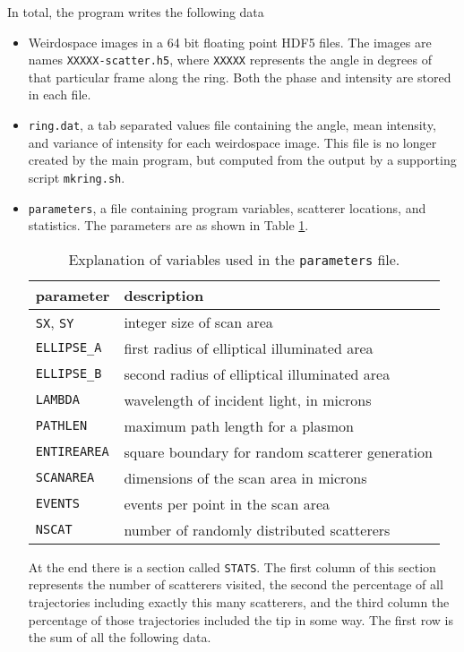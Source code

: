 In total, the program writes the following data
\begin{itemize}
  \item Weirdospace images in a 64 bit floating point HDF5 files.  The images
        are names {\tt XXXXX-scatter.h5}, where {\tt XXXXX} represents the angle
        in degrees of that particular frame along the ring.  Both the phase and
        intensity are stored in each file.
  \item {\tt ring.dat}, a tab separated values file containing the angle,
        mean intensity, and variance of intensity for each weirdospace image.  This
        file is no longer created by the main program, but computed from the output
        by a supporting script {\tt mkring.sh}.
  \item {\tt parameters}, a file containing program variables, scatterer
        locations, and statistics.  The parameters are as shown in Table
        \ref{tbl:parameters}.
        \begin{table}
          \label{tbl:parameters}
          \begin{center}
            \begin{tabular}{ll}
              \toprule
              parameter          & description                                     \\
              \midrule
              {\tt SX}, {\tt SY} & integer size of scan area                       \\
              {\tt ELLIPSE\_A}   & first radius of elliptical illuminated area     \\
              {\tt ELLIPSE\_B}   & second radius of elliptical illuminated area    \\
              {\tt LAMBDA}       & wavelength of incident light, in microns        \\
              {\tt PATHLEN}      & maximum path length for a plasmon               \\
              {\tt ENTIREAREA}   & square boundary for random scatterer generation \\
              {\tt SCANAREA}     & dimensions of the scan area in microns          \\
              {\tt EVENTS}       & events per point in the scan area               \\
              {\tt NSCAT}        & number of randomly distributed scatterers       \\
              \bottomrule
            \end{tabular}
          \end{center}
          \caption{Explanation of variables used in the {\tt parameters} file.}
        \end{table}
        At the end there is a section called {\tt STATS}.  The first column of this
        section represents the number of scatterers visited, the second the
        percentage of all trajectories including exactly this many scatterers, and
        the third column the percentage of those trajectories included the tip in
        some way.  The first row is the sum of all the following data.
\end{itemize}

